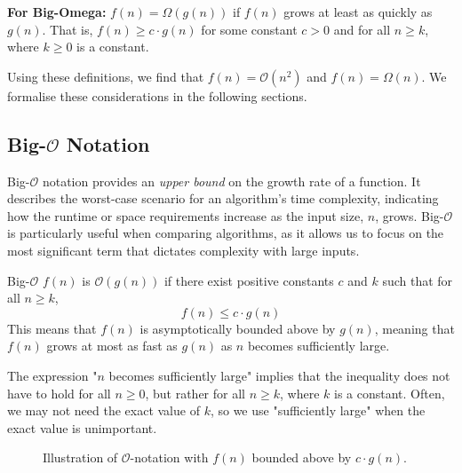 \textbf{For Big-Omega:} \( f(n) = \Omega(g(n)) \) if \( f(n) \) grows at least as quickly as \( g(n) \). That is, \( f(n) \geq c \cdot g(n) \) for some constant \( c > 0 \) and for all \( n \geq k \), where \( k \geq 0 \) is a constant.

Using these definitions, we find that \( f(n) = \mathcal{O}(n^2) \) and \( f(n) = \Omega(n) \). We formalise these considerations in the following sections.

\subsection*{Big-\texorpdfstring{$\mathcal{O}$}{O} Notation}
Big-$\mathcal{O}$ notation provides an \textit{upper bound} on the growth rate of a function. It describes the worst-case scenario for an algorithm’s time complexity, indicating how the runtime or space requirements increase as the input size, $n$, grows. Big-$\mathcal{O}$ is particularly useful when comparing algorithms, as it allows us to focus on the most significant term that dictates complexity with large inputs.

\begin{definition}{Big-$\mathcal{O}$}
    $f(n)$ is $\mathcal{O}(g(n))$ if there exist positive constants $c$ and $k$ such that for all $n \geq k$,
    \medskip
    \[
    f(n) \leq c \cdot g(n)
    \]
    \medskip
    This means that $f(n)$ is asymptotically bounded above by $g(n)$, meaning that $f(n)$ grows at most as fast as $g(n)$ as $n$ becomes sufficiently large.
    \label{def:big_o_notation}
\end{definition}

The expression "$n$ becomes sufficiently large" implies that the inequality does not have to hold for all $n \geq 0$, but rather for all $n \geq k$, where $k$ is a constant. Often, we may not need the exact value of $k$, so we use "sufficiently large" when the exact value is unimportant.

\begin{figure}[h]
    \centering
    \caption{Illustration of \(\mathcal{O}\)-notation with $f(n)$ bounded above by $c \cdot g(n)$.}
    \label{fig:big_o_notation}
\end{figure}

